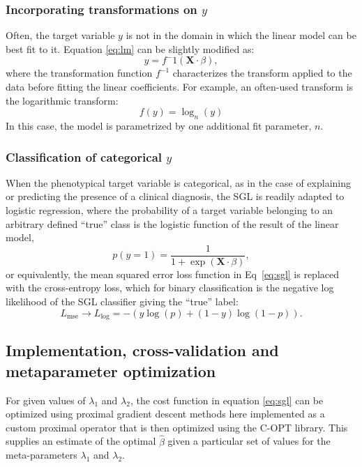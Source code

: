 \subsubsection*{Incorporating transformations on $y$}

Often, the target variable $y$ is not in the domain in which the linear model
can be best fit to it. Equation \ref{eq:lm} can be slightly modified as:
\begin{equation}
y = f^-1(\mathbf{X} \cdot \beta),
\label{eq:lm}
\end{equation}
where the transformation function $f^{-1}$ characterizes the transform applied
to the data before fitting the linear coefficients. For example, an often-used
transform is the logarithmic transform:
\begin{equation}
f(y) = \log_n(y)
\label{eq:log_nonlinearity}
\end{equation}
In this case, the model is parametrized by one additional fit parameter, $n$.

\subsubsection*{Classification of categorical $y$}
When the phenotypical target variable is categorical, as in the case of
explaining or predicting the presence of a clinical diagnosis, the SGL is
readily adapted to logistic regression, where the probability of a target
variable belonging to an arbitrary defined ``true'' class is the logistic
function of the result of the linear model,
\begin{equation}
    p(y = 1) = \frac{1}{1 + \exp(\mathbf{X}\cdot \beta)},
    \label{eq:logit}
\end{equation}
or equivalently, the mean squared error loss function in Eq~\eqref{eq:sgl} is
replaced with the cross-entropy loss, which for binary classification is the
negative log likelihood of the SGL classifier giving the ``true'' label:
\begin{equation}
    L_{\text{mse}} \rightarrow L_{\log} =
    -\left(y \log(p) + (1 - y) \log(1 - p)\right).
    \label{eq:logloss}
\end{equation}

\subsection*{Implementation, cross-validation and metaparameter optimization}

For given values of $\lambda_1$ and $\lambda_2$, the cost function in equation
\ref{eq:sgl} can be optimized using proximal gradient descent methods
\cite{parikh2014proximal} here implemented as a custom proximal operator that is
then optimized using the C-OPT library\cite{copt}. This supplies an estimate of
the optimal $\hat{\beta}$ given a particular set of values for the
meta-parameters $\lambda_1$ and $\lambda_2$.

